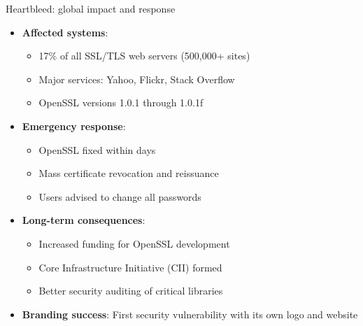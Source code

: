 \ifdefined\PRESENTATION\else\PassOptionsToClass{handout}{beamer}\fi\documentclass[aspectratio=169, lualatex]{beamer}
\begin{document}
\begin{frame}{Heartbleed: global impact and response}
	\begin{itemize}
		\item \textbf{Affected systems}:
		      \begin{itemize}
			      \item 17\% of all SSL/TLS web servers (500,000+ sites)
			      \item Major services: Yahoo, Flickr, Stack Overflow
			      \item OpenSSL versions 1.0.1 through 1.0.1f
		      \end{itemize}
		\item \textbf{Emergency response}:
		      \begin{itemize}
			      \item OpenSSL fixed within days
			      \item Mass certificate revocation and reissuance
			      \item Users advised to change all passwords
		      \end{itemize}
		\item \textbf{Long-term consequences}:
		      \begin{itemize}
			      \item Increased funding for OpenSSL development
			      \item Core Infrastructure Initiative (CII) formed
			      \item Better security auditing of critical libraries
		      \end{itemize}
		\item \textbf{Branding success}: First security vulnerability with its own logo and website
	\end{itemize}
\end{frame}
\end{document}
